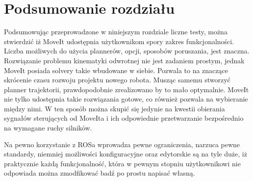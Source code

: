 \section{Podsumowanie rozdziału}

Podsumowując przeprowadzone w niniejszym rozdziale liczne testy, można stwierdzić iż MoveIt udostępnia użytkownikom spory zakres funkcjonalności. Liczba możliwych do użycia plannerów, opcji, sposobów poruszania, jest znaczna. Rozwiązanie problemu kinematyki odwrotnej nie jest zadaniem prostym, jednak MoveIt posiada solvery takie wbudowane w siebie. Pozwala to na znaczące skrócenie czasu rozwoju projektu nowego robota. Musząc samemu stworzyć planner trajektorii, prawdopodobnie zrealizowano by to mało optymalnie. MoveIt nie tylko udostępnia takie rozwiązania gotowe, co również pozwala na wybieranie między nimi. W ten sposób można skupić się jedynie na kwestii obierania sygnałów sterujących od MoveIta i ich odpowiednie przetwarzanie bezpośrednio na wymagane ruchy silników.

Na pewno korzystanie z ROSa wprowadza pewne ograniczenia, narzuca pewne standardy, niemniej możliwości konfiguracyjne oraz edytorskie są na tyle duże, iż praktycznie każdą funkcjonalność, która w pewnym stopniu użytkownikowi nie odpowiada można zmodfikować badź po prostu napisać własną.

